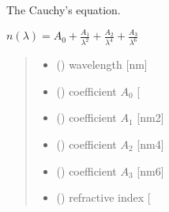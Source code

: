 \documentclass[letterpaper,10pt,english]{sphinxmanual}
\begin{document}
\begin{fulllineitems}
\label{\detokenize{05_refractive_index:skinoptics.refractive_index.n_Cauchy}}
\pysigstartsignatures
{}
\pysigstopsignatures
\sphinxAtStartPar
The Cauchy’s equation.

\sphinxAtStartPar
\(n(\lambda) = A_0 + \frac{A_1}{\lambda^2} + \frac{A_2}{\lambda^4} + \frac{A_3}{\lambda^6}\)
\begin{quote}\begin{description}
\begin{itemize}
\item {} 
\sphinxAtStartPar
{} () \textendash{} wavelength {[}nm{]}

\item {} 
\sphinxAtStartPar
{} () \textendash{} coefficient \(A_0\) {[}\sphinxhyphen{}{]}

\item {} 
\sphinxAtStartPar
{} () \textendash{} coefficient \(A_1\) {[}nm2{]}

\item {} 
\sphinxAtStartPar
{} () \textendash{} coefficient \(A_2\) {[}nm4{]}

\item {} 
\sphinxAtStartPar
{} () \textendash{} coefficient \(A_3\) {[}nm6{]}

\end{itemize}

\sphinxAtStartPar
\begin{itemize}
\item {} 
\sphinxAtStartPar
{} () \textendash{} refractive index {[}\sphinxhyphen{}{]}

\end{itemize}


\end{description}\end{quote}

\end{fulllineitems}
\end{document}
